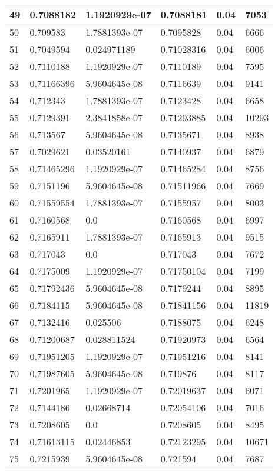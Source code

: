 \begin{longtable}{|l|l|l|l|l|l|}
49 & 0.7088182 & 1.1920929e-07 & 0.7088181 & 0.04 & 7053 \\ \hline 
50 & 0.709583 & 1.7881393e-07 & 0.7095828 & 0.04 & 6666 \\ \hline 
51 & 0.7049594 & 0.024971189 & 0.71028316 & 0.04 & 6006 \\ \hline 
52 & 0.7110188 & 1.1920929e-07 & 0.7110189 & 0.04 & 7595 \\ \hline 
53 & 0.71166396 & 5.9604645e-08 & 0.7116639 & 0.04 & 9141 \\ \hline 
54 & 0.712343 & 1.7881393e-07 & 0.7123428 & 0.04 & 6658 \\ \hline 
55 & 0.7129391 & 2.3841858e-07 & 0.71293885 & 0.04 & 10293 \\ \hline 
56 & 0.713567 & 5.9604645e-08 & 0.7135671 & 0.04 & 8938 \\ \hline 
57 & 0.7029621 & 0.03520161 & 0.7140937 & 0.04 & 6879 \\ \hline 
58 & 0.71465296 & 1.1920929e-07 & 0.71465284 & 0.04 & 8756 \\ \hline 
59 & 0.7151196 & 5.9604645e-08 & 0.71511966 & 0.04 & 7669 \\ \hline 
60 & 0.71559554 & 1.7881393e-07 & 0.7155957 & 0.04 & 8003 \\ \hline 
61 & 0.7160568 & 0.0 & 0.7160568 & 0.04 & 6997 \\ \hline 
62 & 0.7165911 & 1.7881393e-07 & 0.7165913 & 0.04 & 9515 \\ \hline 
63 & 0.717043 & 0.0 & 0.717043 & 0.04 & 7672 \\ \hline 
64 & 0.7175009 & 1.1920929e-07 & 0.71750104 & 0.04 & 7199 \\ \hline 
65 & 0.71792436 & 5.9604645e-08 & 0.7179244 & 0.04 & 8895 \\ \hline 
66 & 0.7184115 & 5.9604645e-08 & 0.71841156 & 0.04 & 11819 \\ \hline 
67 & 0.7132416 & 0.025506 & 0.7188075 & 0.04 & 6248 \\ \hline 
68 & 0.71200687 & 0.028811524 & 0.71920973 & 0.04 & 6564 \\ \hline 
69 & 0.71951205 & 1.1920929e-07 & 0.71951216 & 0.04 & 8141 \\ \hline 
70 & 0.71987605 & 5.9604645e-08 & 0.719876 & 0.04 & 8117 \\ \hline 
71 & 0.7201965 & 1.1920929e-07 & 0.72019637 & 0.04 & 6071 \\ \hline 
72 & 0.7144186 & 0.02668714 & 0.72054106 & 0.04 & 7016 \\ \hline 
73 & 0.7208605 & 0.0 & 0.7208605 & 0.04 & 8495 \\ \hline 
74 & 0.71613115 & 0.02446853 & 0.72123295 & 0.04 & 10671 \\ \hline 
75 & 0.7215939 & 5.9604645e-08 & 0.721594 & 0.04 & 7687 \\ \hline 
\end{longtable}